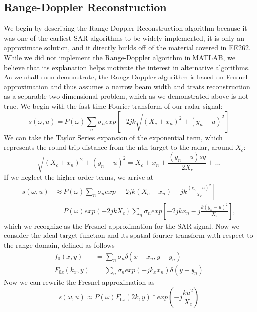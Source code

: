 \documentclass{article}
\begin{document}
\subsection{Range-Doppler Reconstruction}
We begin by describing the Range-Doppler Reconstruction algorithm because it was one of the earliest SAR algorithms to be widely implemented, it is only an approximate solution, and it directly builds off of the material covered in EE262. While we did not implement the Range-Doppler algorithm in MATLAB, we believe that its explanation helps motivate the interest in alternative algorithms. As we shall soon demonstrate, the Range-Doppler algorithm is based on Fresnel approximation and thus assumes a narrow beam width and treats reconstruction as a separable two-dimensional problem, which as we demonstrated above is not true. We begin with the fast-time Fourier transform of our radar signal:
\begin{displaymath}
	s( \omega , u) = P(\omega) \sum\limits_{n}^{} \sigma_{n} exp\left[ -2jk \sqrt{(X_{c} + x_{n})^2 +(y_{n} - u)^2} \right] 
\end{displaymath}
We can take the Taylor Series expansion of the exponential term, which represents the round-trip distance from the nth target to the radar, around \( X_{c} \):
\begin{displaymath}
	\sqrt{(X_{c} + x_{n})^2 +(y_{n} - u)^2} = X_{c} + x_{n} + \frac{(y_{n} - u) sq}{2 X_{c} } + ...
\end{displaymath}
If we neglect the higher order terms, we arrive at
\begin{align*}
	s( \omega , u) &\approx P(\omega) \sum\limits_{n}^{} \sigma_{n} exp\left[ -2jk(X_{c} + x_{n}) - j k \frac{(y_{n} - u)^2 }{X_{c}} \right]\\
				   &= P(\omega) exp(-2jk X_{c} ) \sum\limits_{n}^{} \sigma_{n} exp\left[ -2jk x_{n} - j \frac{k(y_{n} - u)^2}{X_{c}} \right], 
\end{align*}
which we recognize as the Fresnel approximation for the SAR signal. Now we consider the ideal target function and its spatial fourier transform with respect to the range domain, defined as follows
\begin{align*}
	f_0(x,y) &= \sum\limits_{n}^{} \sigma_{n} \delta(x - x_{n} , y - y_{n}) \\
	F_{0x}(k_{x} , y) &= \sum\limits_{n}^{} \sigma_{n} exp(-j k_{x} x_{n}) \delta (y - y_{n}) 
\end{align*}
Now we can rewrite the Fresnel approximation as
\begin{displaymath}
	s(\omega , u) \approx P(\omega) F_{0x}(2k , y) * exp\left( -j \frac{k u^2}{X_{c} }\right)
\end{displaymath}
\end{document}
